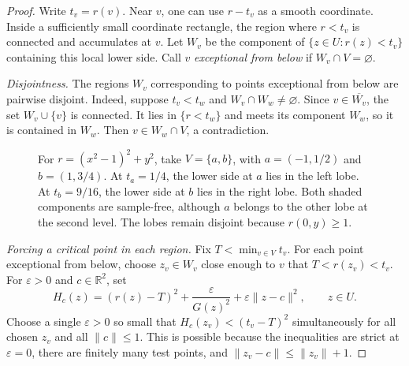 \documentclass[11pt,letterpaper]{article}
\newcommand{\R}{\mathbb R}
\newcommand{\norm}[1]{\lVert#1\rVert}
\begin{document}
\begin{proof}
Write $t_v=r(v)$. Near $v$, one can use $r-t_v$ as a smooth coordinate. Inside a sufficiently small coordinate rectangle, the region where $r<t_v$ is connected and accumulates at $v$. Let $W_v$ be the component of $\{z\in U:r(z)<t_v\}$ containing this local lower side. Call $v$ \emph{exceptional from below} if $W_v\cap V=\varnothing$.

\emph{Disjointness.} The regions $W_v$ corresponding to points exceptional from below are pairwise disjoint. Indeed, suppose $t_v<t_w$ and $W_v\cap W_w\neq\varnothing$. Since $v\in\overline{W_v}$, the set $W_v\cup\{v\}$ is connected. It lies in $\{r<t_w\}$ and meets its component $W_w$, so it is contained in $W_w$. Then $v\in W_w\cap V$, a contradiction.

\begin{figure}[htbp]
\centering
{}
\caption{For $r=(x^2-1)^2+y^2$, take $V=\{a,b\}$, with $a=(-1,1/2)$ and $b=(1,3/4)$. At $t_a=1/4$, the lower side at $a$ lies in the left lobe. At $t_b=9/16$, the lower side at $b$ lies in the right lobe. Both shaded components are sample-free, although $a$ belongs to the other lobe at the second level. The lobes remain disjoint because $r(0,y)\geq1$.}
\end{figure}

\emph{Forcing a critical point in each region.} Fix $T<\min_{v\in V}t_v$. For each point exceptional from below, choose $z_v\in W_v$ close enough to $v$ that $T<r(z_v)<t_v$. For $\varepsilon>0$ and $c\in\R^2$, set
\begin{equation}\label{eq:barrier}
H_c(z)=(r(z)-T)^2+\frac{\varepsilon}{G(z)^2}+\varepsilon\norm{z-c}^2,
\qquad z\in U.
\end{equation}
Choose a single $\varepsilon>0$ so small that $H_c(z_v)<(t_v-T)^2$ simultaneously for all chosen $z_v$ and all $\norm c\leq1$. This is possible because the inequalities are strict at $\varepsilon=0$, there are finitely many test points, and $\norm{z_v-c}\leq\norm{z_v}+1$.


\end{proof}
\end{document}
